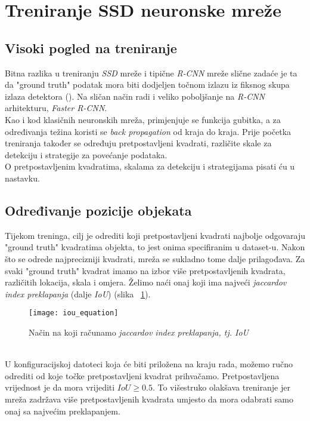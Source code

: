\section{Treniranje SSD neuronske mreže}
\subsection{Visoki pogled na treniranje}
Bitna razlika u treniranju \emph{SSD} mreže i tipične \emph{R-CNN} mreže slične zadaće je ta da "ground truth" podatak mora biti dodjeljen točnom izlazu iz fiksnog skupa izlaza detektora (\cite{liu2016ssd}).
Na sličan način radi i veliko poboljšanje na \emph{R-CNN} arhitekturu, \emph{Faster R-CNN}. \\
Kao i kod klasičnih neuronskih mreža, primjenjuje se funkcija gubitka, a za određivanja težina koristi se \emph{back propagation} od kraja do kraja.
Prije početka treniranja također se određuju pretpostavljeni kvadrati, različite skale za detekciju i strategije za povećanje podataka. \\
O pretpostavljenim kvadratima, skalama za detekciju i strategijama pisati ću u nastavku.
\subsection{Određivanje pozicije objekata}
Tijekom treninga, cilj je odrediti koji pretpostavljeni kvadrati najbolje odgovaraju "ground truth" kvadratima objekta, to jest onima specifiranim u dataset-u.
Nakon što se odrede najprecizniji kvadrati, mreža se sukladno tome dalje prilagođava.
Za svaki "ground truth" kvadrat imamo na izbor više pretpostavljenih kvadrata, različitih lokacija, skala i omjera.
Želimo naći onaj koji ima najveći \emph{jaccardov index preklapanja} (dalje \emph{IoU}) (slika ~\ref{fig:JaccardIndex}).
\begin{figure}[h!]
	\centering
	\texttt{[image: iou\_equation]}
	 \caption{Način na koji računamo \emph{jaccardov index preklapanja, tj. IoU}}
 	 \label{fig:JaccardIndex}
\end{figure} \\
U konfiguracijskoj datoteci koja će biti priložena na kraju rada, možemo ručno odrediti od koje točke pretpostavljeni kvadrat prihvačamo.
Pretpostavljena vrijednost je da mora vrijediti $IoU \geq 0.5$.
To višestruko olakšava treniranje jer mreža zadržava više pretpostavljenih kvadrata umjesto da mora odabrati samo onaj sa najvećim preklapanjem.

